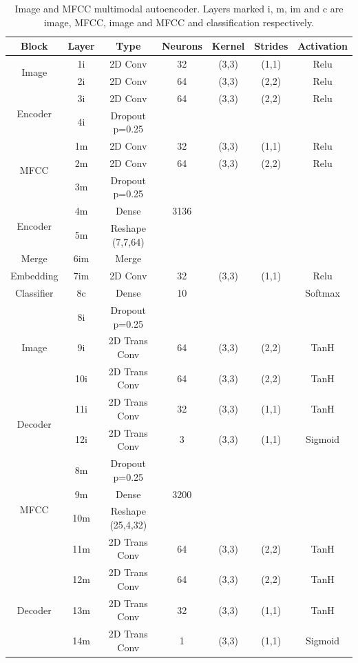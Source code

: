 	\begin{table}
		\centering
		\begin{tabular}{|c|c|c|c|c|c|c|}
			\hline
			Block & Layer & Type & Neurons & Kernel & Strides & Activation \\ \hline
			\multirow{2}{*}{Image} & 1i	&	2D Conv & 32 & (3,3) & (1,1) & Relu \\ \cline{2-7}
			& 2i	&	2D Conv & 64 & (3,3) & (2,2) & Relu \\ \cline{2-7}
			\multirow{2}{*}{Encoder}& 3i	&	2D Conv & 64 & (3,3) & (2,2) & Relu \\ \cline{2-7}
			& 4i	&	Dropout p=0.25 &	 & 	     &       &  \\ \hline

			\multirow{3}{*}{MFCC} & 1m	&	2D Conv & 32 & (3,3) & (1,1) & Relu \\ \cline{2-7}
			& 2m	&	2D Conv & 64 & (3,3) & (2,2) & Relu \\ \cline{2-7}
			& 3m 	&	Dropout p=0.25 &	 & 	     &       & \\ \cline{2-7}
			\multirow{2}{*}{Encoder} & 4m	&	Dense          & 3136 & 	 &       & \\ \cline{2-7}
			& 5m  &	Reshape (7,7,64) & & & & \\ \hline

			Merge & 6im	& Merge & & & & \\ \hline
			Embedding& 7im	&	2D Conv & 32 & (3,3) & (1,1) & Relu \\ \hline
			Classifier & 8c	&	Dense          & 10 &       &       & Softmax \\ \hline

			\multirow{3}{*}{Image} & 8i 	&	Dropout p=0.25 &	 & 	     &       & \\ \cline{2-7}
			& 9i	&	2D Trans Conv & 64 & (3,3) & (2,2)  & TanH \\ \cline{2-7}
			& 10i	&	2D Trans Conv & 64 & (3,3) & (2,2)  & TanH \\ \cline{2-7}
			\multirow{2}{*}{Decoder}& 11i	&	2D Trans Conv & 32 & (3,3) & (1,1)  & TanH \\ \cline{2-7}
			& 12i	&	2D Trans Conv & 3 & (3,3) & (1,1) & Sigmoid\\ \hline 

			\multirow{4}{*}{MFCC} & 8m 	&	Dropout p=0.25 &	 & 	     &        & \\ \cline{2-7}
			& 9m	&	Dense			& 3200 & &           & \\ \cline{2-7}
			& 10m	&	Reshape (25,4,32) & & & &\\ \cline{2-7}
			& 11m	&	2D Trans Conv & 64 & (3,3) & (2,2)  & TanH \\ \cline{2-7}
			\multirow{3}{*}{Decoder}& 12m	&	2D Trans Conv & 64 & (3,3) & (2,2)  & TanH \\ \cline{2-7}
			& 13m	&	2D Trans Conv & 32 & (3,3) & (1,1)  & TanH \\ \cline{2-7}
			& 14m	&	2D Trans Conv & 1 & (3,3) & (1,1)  & Sigmoid\\ \hline
		\end{tabular}
		\caption{Image and MFCC multimodal autoencoder. Layers marked i, m, im and c are image, MFCC, image and MFCC and classification respectively.}
		\label{tab:UCU_MNIST_MAE_description}


\end{table}
